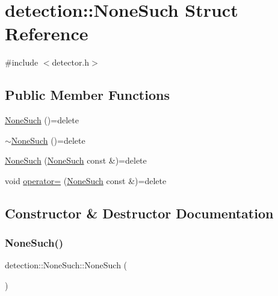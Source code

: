 \hypertarget{structdetection_1_1_none_such}{}\section{detection\+:\+:None\+Such Struct Reference}
\label{structdetection_1_1_none_such}


{\ttfamily \#include $<$detector.\+h$>$}

\subsection*{Public Member Functions}
\begin{DoxyCompactItemize}
\item 
\hyperlink{structdetection_1_1_none_such_a4ac3b272cd5ac3f2a69ca4fb25019715}{None\+Such} ()=delete
\item 
\hyperlink{structdetection_1_1_none_such_a0f135f597d286aa8b78074c552dfe137}{$\sim$\+None\+Such} ()=delete
\item 
\hyperlink{structdetection_1_1_none_such_afde4c614a0b571a38cb7fc1a68c81079}{None\+Such} (\hyperlink{structdetection_1_1_none_such}{None\+Such} const \&)=delete
\item 
void \hyperlink{structdetection_1_1_none_such_a2afbd1de76f456baf1e64e90454db0b3}{operator=} (\hyperlink{structdetection_1_1_none_such}{None\+Such} const \&)=delete
\end{DoxyCompactItemize}


\subsection{Constructor \& Destructor Documentation}
\mbox{\label{structdetection_1_1_none_such_a4ac3b272cd5ac3f2a69ca4fb25019715}} 
\subsubsection{\texorpdfstring{None\+Such()}{NoneSuch()}\hspace{0.1cm}{\footnotesize\ttfamily [1/2]}}
{\footnotesize\ttfamily detection\+::\+None\+Such\+::\+None\+Such (\begin{DoxyParamCaption}{ }\end{DoxyParamCaption})\hspace{0.3cm}{\ttfamily [delete]}}

